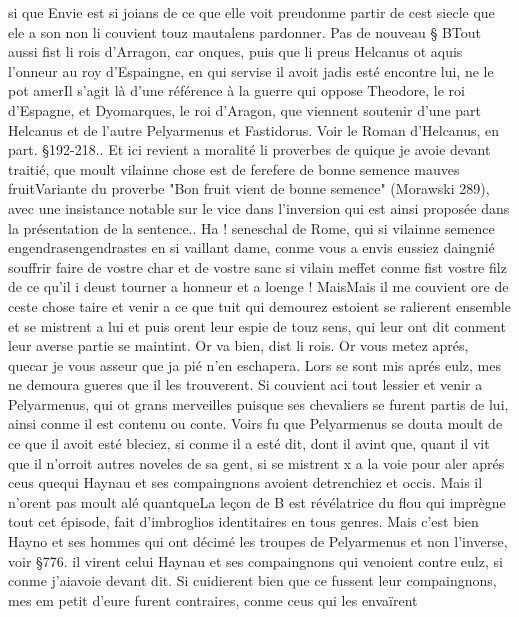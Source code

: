 \documentclass{article}
\begin{document}
\begin{pages}
   si que Envie est si joians de ce que elle voit preudonme partir de cest siecle que ele a son non li couvient touz mautalens pardonner. \pend
\pstart Pas de nouveau § BTout aussi fist 
   li rois 
   d’Arragon, car onques, puis que li preus Helcanus ot aquis 
   l’onneur au roy d’Espaingne, en qui servise il avoit 
   jadis esté encontre lui, ne le pot amerIl s'agit là d'une référence à la guerre qui oppose 
   Theodore, le roi d'Espagne, et Dyomarques, le roi d'Aragon, que viennent soutenir d'une part Helcanus et de l'autre Pelyarmenus 
   et Fastidorus. Voir le Roman d'Helcanus, en part. §192-218.. Et ici revient a moralité li proverbes 
   de quique je avoie devant traitié, 
   que moult vilainne chose est de ferefere de 
      bonne semence mauves fruitVariante du proverbe "Bon fruit vient de bonne semence" (Morawski 289), 
      avec une insistance notable sur le vice dans l'inversion qui est ainsi proposée dans la présentation de la sentence.. 
   Ha ! seneschal de Rome, qui si vilainne semence 
   engendrasengendrastes en 
   si vaillant dame, 
   conme vous a envis eussiez daingnié souffrir faire de vostre char et de vostre sanc si vilain meffet 
   conme fist vostre filz de ce qu’il i deust tourner a honneur et a loenge ! 
   MaisMais il me couvient ore de ceste chose 
      taire et venir a ce que tuit qui demourez estoient se ralierent ensemble et se mistrent a lui et puis orent leur espie de 
   touz sens, qui leur ont dit conment leur 
      averse partie se maintint.
   Or va bien, dist li rois. Or vous metez aprés, 
      quecar je vous asseur que ja pié n’en eschapera.
   Lors se sont mis aprés eulz, mes ne demoura gueres que il les trouverent. 
   Si couvient aci tout lessier et venir a Pelyarmenus, 
   qui ot grans merveilles puisque ses chevaliers se furent partis de lui, ainsi conme il est contenu ou conte. \pend
\pstart Voirs fu que Pelyarmenus se douta moult de ce 
   que il avoit esté bleciez, si conme il a esté dit, dont il avint que, quant il vit que il n’orroit 
   autres noveles de sa gent, si se mistrent x a la voie pour aler aprés ceus 
   quequi Haynau et ses compaingnons avoient 
   detrenchiez et occis. Mais il n’orent pas moult alé 
   quantqueLa leçon de B est révélatrice du flou
   qui imprègne tout cet épisode, fait d'imbroglios identitaires en tous genres. Mais c'est bien Hayno et ses hommes qui ont décimé 
   les troupes de Pelyarmenus et non l'inverse, voir §776. il virent celui 
   Haynau et ses compaingnons qui venoient contre eulz, si conme 
      j’aiavoie devant dit. 
   Si cuidierent bien que ce fussent leur compaingnons, mes em petit d’eure furent contraires, conme ceus qui les envaïrent 

\end{pages}
\end{document}

